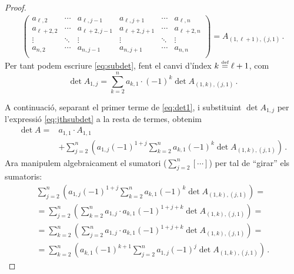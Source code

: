 \begin{lema}
\begin{proof}
\begin{equation*}
\begin{split}
\begin{pmatrix}
		a_{\ell,2}&\cdots&a_{\ell,j-1}&a_{\ell,j+1}&\cdots& a_{\ell,n}\\
		a_{\ell+2,2}&\cdots&a_{\ell+2,j-1}&a_{\ell+2,j+1}&\cdots&	a_{\ell+2,n}\\
		\vdots&	\ddots&	\vdots&	\vdots&	\ddots&		\vdots\\
		a_{n,2}&   \cdots&	a_{n,j-1}&	a_{n,j+1}&\cdots&a_{n,n}\\
		\end{pmatrix} = A_{(1,\ell+1),(j,1)}
		\,.
		\end{split}
		\end{equation*}
		Per tant podem escriure \eqref{eq:subdet}, fent el canvi d'índex $k\stackrel{\text{\tiny def}}{=} \ell+1$, com 
		\begin{equation}\label{eq:jthsubdet}
		\det A_{1,j} = \sum_{k=2}^{n} a_{k,1}\cdot(-1)^{k}\det A_{(1,k),(j,1)}\,.
		\end{equation}
		
		A continuació, separant el primer terme de \eqref{eq:det1}, i substituint $\det A_{1,j}$ per l'expressió \eqref{eq:jthsubdet} a la resta de termes, obtenim
		\begin{equation}\label{eq:parrafada}
		\begin{split}
		\det A ={}& a_{1,1}\cdot A_{1,1} \\
		&+\sum_{j=2}^{n} \left(a_{1,j} (-1)^{1+j}  \sum_{k=2}^{n} a_{k,1} (-1)^{k} \det A_{(1,k),(j,1)}\right)\,.
		\end{split}
		\end{equation}
		Ara manipulem algebraicament el sumatori  ($\sum_{j=2}^n [\cdots]$) per tal de ``girar'' els sumatoris:
		\begin{multline}\label{eq:sumofjth}
		\sum_{j=2}^{n} \left(a_{1,j} (-1)^{1+j}  \sum_{k=2}^{n} a_{k,1} (-1)^{k} \det A_{(1,k),(j,1)}\right)=\\
		=\sum_{j=2}^{n} \left(  \sum_{k=2}^{n} a_{1,j}\cdot a_{k,1} (-1)^{1+j+k} \det A_{(1,k),(j,1)}\right)=\\
		=\sum_{k=2}^{n} \left(  \sum_{j=2}^{n} a_{1,j}\cdot a_{k,1} (-1)^{1+j+k} \det A_{(1,k),(j,1)}\right)=\\
		=\sum_{k=2}^{n} \left(a_{k,1} (-1)^{k+1}  \sum_{j=2}^{n} a_{1,j} (-1)^{j} \det A_{(1,k),(j,1)}\right)\,.
		\end{multline}
		

\end{proof}
\end{lema}
